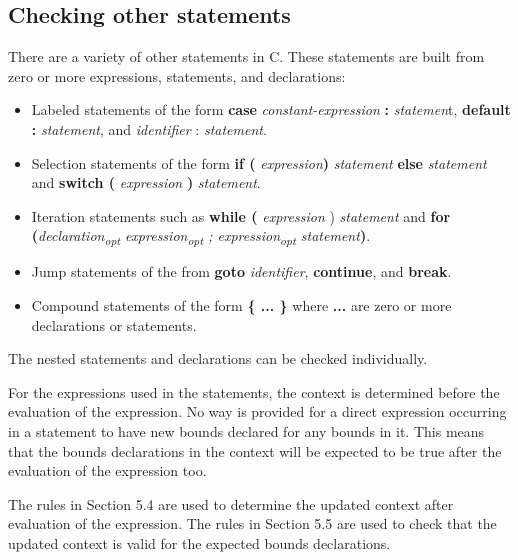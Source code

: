 \documentclass[]{article}
\begin{document}
\subsection{\texorpdfstring{\protect\hypertarget{ux5fToc426641090}{}{\protect\hypertarget{ux5fToc435434965}{}{\protect\hypertarget{ux5fToc437460793}{}{\protect\hypertarget{ux5fToc440445474}{}{\protect\hypertarget{ux5fToc440449256}{}{\protect\hypertarget{ux5fToc440551906}{}{}}}}}}Checking
other
statements}{Checking other statements}}\label{checking-other-statements}

There are a variety of other statements in C. These statements are built
from zero or more expressions, statements, and declarations:

\begin{itemize}
\item
  Labeled statements of the form \textbf{case}
  \emph{constant-expression} \textbf{:} \emph{statemen}t,
  \textbf{default :} \emph{statement}, and \emph{identifier} :
  \emph{statement}.
\item
  Selection statements of the form \textbf{if (}
  \emph{expression}\textbf{)} \emph{statement} \textbf{else}
  \emph{statement} and \textbf{switch (} \emph{expression} \textbf{)}
  \emph{statement}.
\item
  Iteration statements such as \textbf{while (} \emph{expression} )
  \emph{statement} and \textbf{for
  (}\emph{declaration\textsubscript{opt}}
  \emph{expression\textsubscript{opt} ; expression\textsubscript{opt}
  statement}\textbf{)}.
\item
  Jump statements of the from \textbf{goto} \emph{identifier},
  \textbf{continue}, and \textbf{break}.
\item
  Compound statements of the form \textbf{\{ ... \}} where \textbf{...}
  are zero or more declarations or statements.
\end{itemize}

The nested statements and declarations can be checked individually.

For the expressions used in the statements, the context is determined
before the evaluation of the expression. No way is provided for a direct
expression occurring in a statement to have new bounds declared for any
bounds in it. This means that the bounds declarations in the context
will be expected to be true after the evaluation of the expression too.

\protect\hypertarget{ux5fRef424898277}{}{}The rules in Section 5.4 are
used to determine the updated context after evaluation of the
expression. The rules in Section 5.5 are used to check that the updated
context is valid for the expected bounds declarations.
\end{document}
